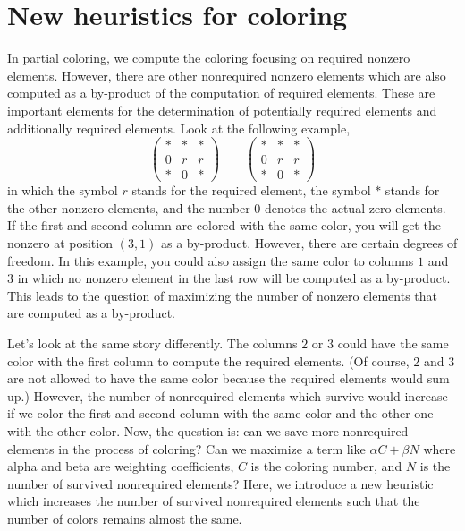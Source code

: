 \documentclass[12pt, oneside]{book}
\begin{document}
\section{New heuristics for coloring}
\label{s.heuristic}
In partial coloring, we compute the coloring focusing on
required nonzero elements. However, there are other nonrequired nonzero elements which are also computed as a by-product of the computation of required elements. These are important elements for the determination of potentially required elements and additionally required elements. Look at the following example,
\begin{equation}
\left(\begin{array}{rrb}
* & * & *\\
0 & r & r \\
* & 0 & *
\end{array}\right)
\qquad
\left(\begin{array}{rbr}
* & * & *\\
0 & r & r \\
* & 0 & *
\end{array}\right)
\label{twocolorings}
\end{equation}
in which the symbol $r$ stands for the required element, the symbol \textit{$*$} stands for the other nonzero elements, and the number $0$ denotes the actual zero elements. If the first and second column are colored with the same color, you will get the nonzero at position $(3,1)$ as a by-product. However, there are certain degrees of freedom. In
this example, you could also assign the same color to columns $1$ and
$3$ in which no nonzero element in the last row will be computed
as a by-product. This leads to the question of maximizing the number of nonzero elements that are computed as a by-product.

Let's look at the same story differently. The columns $2$ or $3$ could have the same color with the first column to compute the
required elements. (Of course, $2$ and $3$ are not allowed to have the same color because the required elements would sum up.) However, the number of nonrequired elements which survive would increase if
we color the first and second column with the same color and the
other one with the other color. Now, the question is: can we save
more nonrequired elements in the process of coloring? Can we maximize a term like $\alpha C + \beta N$ where alpha and beta are
weighting coefficients, $C$ is the coloring number, and $N$ is the
number of survived nonrequired elements?
Here, we introduce a new heuristic which increases the number of survived nonrequired elements such that the number of colors remains almost the same.
\end{document}
